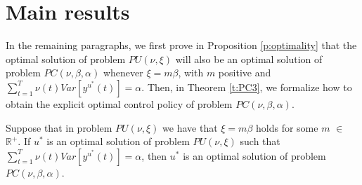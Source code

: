 \chapter{Main results} \label{chap:res}

In the remaining paragraphs, we first prove in Proposition \ref{p:optimality} that the optimal solution of problem $PU(\nu,\xi)$ will also be an optimal solution of problem $PC(\nu,\beta,\alpha)$ whenever $\xi=m \beta$, with $m$ positive and $\sum_{t=1}^{T} \nu(t)Var\left[y^{u^*}(t)\right] = \alpha$.
Then, in Theorem \ref{t:PC3}, we formalize how to obtain the explicit optimal control policy of problem $PC(\nu,\beta,\alpha)$. %

\begin{prop} \label{p:optimality}
	Suppose that in problem $PU(\nu,\xi)$ we have that $\xi=m\beta$ holds for some $m$ $\in$ $\mathbb{R^+}$.
	If $u^{*}$ is an optimal solution of problem $PU(\nu,\xi)$ such that  
		$\sum_{t=1}^{T} \nu(t)Var\left[y^{u^*}(t)\right] = \alpha$,
	then $u^{*}$ is an optimal solution of problem $PC(\nu,\beta,\alpha)$.
\end{prop}

